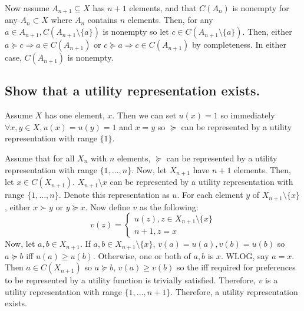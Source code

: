 \documentclass[11pt]{article} %
\begin{document}
Now assume $A_{n+1}\subseteq X$ has $n+1$ elements, and that $C(A_n)$ is nonempty for any $A_n \subset X$ where $A_n$ contains $n$ elements. Then, for any $a \in A_{n+1}, C(A_{n+1} \setminus \{ a\})$ is nonempty so let $c \in  C(A_{n+1} \setminus \{ a\}).$ Then, either $a \succeq c \Rightarrow a \in C(A_{n+1})$ or $c\succeq a \Rightarrow c \in C(A_{n+1})$ by completeness. In either case, $C(A_{n+1})$ is nonempty.
\subsection{Show that a utility representation exists.}
Assume $X$ has one element, $x$. Then we can set $u(x) = 1$ so immediately $\forall x,y \in X, u(x) = u(y) = 1$ and $x = y$ so $\succeq$ can be represented by a utility representation with range $\{ 1\}$.

Assume that for all $X_n$ with $n$ elements, $\succeq$ can be represented by a utility representation with range $\{ 1 ,\dots, n\}$. Now, let $X_{n+1}$ have $n+1$ elements. Then, let $x\in C(X_{n+1}).$ $X_{n+1}\setminus x$ can be represented by a utility representation with range  $\{ 1 ,\dots, n\}$. Denote this representation as $u$. For each element $y$ of $X_{n+1}\setminus \{x\}$, either $x \succ y$ or $y \succeq x.$ Now define $v$ as the following:
\begin{equation*}
v(z) = \begin{cases}u(z), z \in X_{n+1}\setminus \{x\} \\  n+1, z=x \end{cases}
\end{equation*} 
Now, let $a,b\in X_{n+1}.$ If $a,b \in X_{n+1} \setminus \{x\}$, $v(a)=u(a),v(b)=u(b)$ so $a\succeq b$ iff $u(a)\geq u(b).$ Otherwise, one or both of $a,b$ is $x$. WLOG, say $a=x$.  Then $a\in C(X_{n+1})$ so $a\succeq b$, $v(a)\geq v(b)$ so the iff required for preferences to be represented by a utility function is trivially satisfied. Therefore, $v$ is a utility representation with range $\{ 1,\dots,n+1\}$. Therefore, a utility representation exists.
\end{document}
